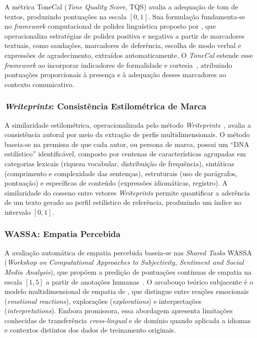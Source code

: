 \documentclass[12pt, a4paper]{article}
\numberwithin{equation}{section}
\begin{document}
A métrica ToneCal (\textit{Tone Quality Score}, TQS) avalia a adequação de tom de textos, produzindo pontuações na escala $[0, 1]$. Sua formulação fundamenta-se no \textit{framework} computacional de polidez linguística proposto por , que operacionaliza estratégias de polidez positiva e negativa a partir de marcadores textuais, como saudações, marcadores de deferência, escolha de modo verbal e expressões de agradecimento, extraídos automaticamente. O \textit{ToneCal} estende esse \textit{framework} ao incorporar indicadores de formalidade e cortesia~\cite{balshetwar2019}, atribuindo pontuações proporcionais à presença e à adequação desses marcadores ao contexto comunicativo.

\subsubsection{\textit{Writeprints}: Consistência Estilométrica de Marca}

A similaridade estilométrica, operacionalizada pelo método \textit{Writeprints}~\cite{abbasi2008}, avalia a consistência autoral por meio da extração de perfis multidimensionais. O método baseia-se na premissa de que cada autor, ou persona de marca, possui um ``DNA estilístico'' identificável, composto por centenas de características agrupadas em categorias lexicais (riqueza vocabular, distribuição de frequência), sintáticas (comprimento e complexidade das sentenças), estruturais (uso de parágrafos, pontuação) e específicas de conteúdo (expressões idiomáticas, registro). A similaridade do cosseno entre vetores \textit{Writeprints} permite quantificar a aderência de um texto gerado ao perfil estilístico de referência, produzindo um índice no intervalo $[0, 1]$.

\subsubsection{WASSA: Empatia Percebida}

A avaliação automática de empatia percebida baseia-se nas \textit{Shared Tasks} WASSA (\textit{Workshop on Computational Approaches to Subjectivity, Sentiment and Social Media Analysis}), que propõem a predição de pontuações contínuas de empatia na escala $[1, 5]$ a partir de anotações humanas~\cite{barriere2022, barriere2023, giorgi2024}. O arcabouço teórico subjacente é o modelo multidimensional de empatia de , que distingue entre reações emocionais (\textit{emotional reactions}), explorações (\textit{explorations}) e interpretações (\textit{interpretations}). Embora promissora, essa abordagem apresenta limitações conhecidas de transferência \textit{cross-lingual} e de domínio quando aplicada a idiomas e contextos distintos dos dados de treinamento originais.
\end{document}
